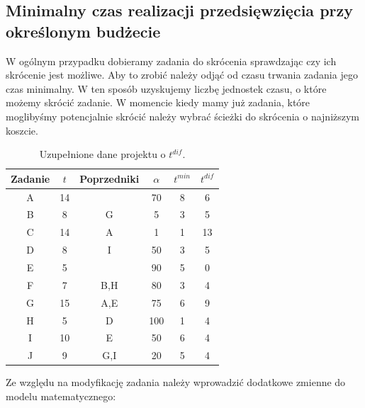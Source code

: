 \documentclass[
    12pt, %
]{../fphw}
\begin{document}
\subsection{Minimalny czas realizacji przedsięwzięcia przy określonym budżecie}
W ogólnym przypadku dobieramy zadania do skrócenia sprawdzając czy ich skrócenie jest możliwe.
Aby to zrobić należy odjąć od czasu trwania zadania jego czas minimalny.
W ten sposób uzyskujemy liczbę jednostek czasu, o które możemy skrócić zadanie.
W momencie kiedy mamy już zadania, które moglibyśmy potencjalnie skrócić należy wybrać
ścieżki do skrócenia o najniższym koszcie.
\begin{table}[H]
    \centering
    \begin{tabular} {| c | c | c | c | c | c |}
        \hline
        Zadanie & \(t\) & Poprzedniki & \(\alpha\) & \(t^{min}\) & \(t^{dif}\) \\
        \hline
        A       & 14    &             & 70         & 8           & 6           \\
        \hline
        B       & 8     & G           & 5          & 3           & 5           \\
        \hline
        C       & 14    & A           & 1          & 1           & 13          \\
        \hline
        D       & 8     & I           & 50         & 3           & 5           \\
        \hline
        E       & 5     &             & 90         & 5           & 0           \\
        \hline
        F       & 7     & B,H         & 80         & 3           & 4           \\
        \hline
        G       & 15    & A,E         & 75         & 6           & 9           \\
        \hline
        H       & 5     & D           & 100        & 1           & 4           \\
        \hline
        I       & 10    & E           & 50         & 6           & 4           \\
        \hline
        J       & 9     & G,I         & 20         & 5           & 4           \\
        \hline
    \end{tabular}
    \caption{Uzupełnione dane projektu o \(t^{dif}\).}
    \label{tab:dane_uzup}
\end{table}
Ze względu na modyfikację zadania należy wprowadzić dodatkowe zmienne do modelu matematycznego: \\
\end{document}
